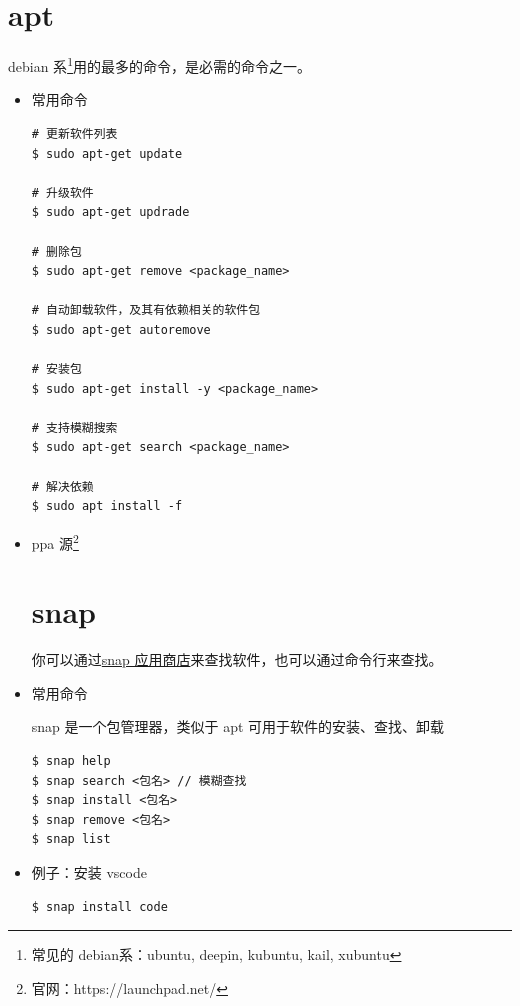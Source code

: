 \section{apt}
debian 系\footnote{常见的 debian系：ubuntu, deepin, kubuntu, kail, xubuntu}用的最多的命令，是必需的命令之一。
\begin{itemize}
\item 常用命令
\begin{lstlisting}
# 更新软件列表
$ sudo apt-get update 

# 升级软件
$ sudo apt-get updrade 

# 删除包
$ sudo apt-get remove <package_name>

# 自动卸载软件，及其有依赖相关的软件包
$ sudo apt-get autoremove 

# 安装包
$ sudo apt-get install -y <package_name>

# 支持模糊搜索  
$ sudo apt-get search <package_name> 

# 解决依赖
$ sudo apt install -f
\end{lstlisting}


\item ppa 源\footnote{官网：https://launchpad.net/}
\newpage
	
\section{snap}
你可以通过\href{https://snapcraft.io/}{snap 应用商店}来查找软件，也可以通过命令行来查找。

\item 常用命令

snap 是一个包管理器，类似于 apt 可用于软件的安装、查找、卸载
\begin{lstlisting}
$ snap help 
$ snap search <包名> // 模糊查找
$ snap install <包名>
$ snap remove <包名>
$ snap list 
\end{lstlisting}

\item 例子：安装 vscode 
\begin{lstlisting}
$ snap install code
\end{lstlisting}
\end{itemize}
